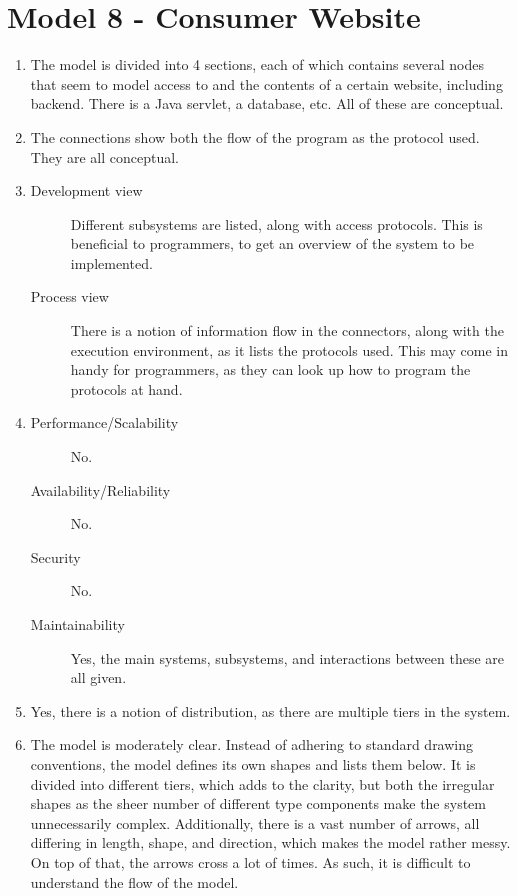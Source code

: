 \section{Model 8 - Consumer Website}
\begin{enumerate}
	\item The model is divided into 4 sections, each of which contains several nodes that seem to model access to and the contents of a certain website, including backend. There is a Java servlet, a database, etc.
	All of these are conceptual.
	
	\item The connections show both the flow of the program as the protocol used. They are all conceptual.
	
	\item
	\begin{description}
		\item[Development view] Different subsystems are listed, along with access protocols. This is beneficial to programmers, to get an overview of the system to be implemented.
		\item[Process view] There is a notion of information flow in the connectors, along with the execution environment, as it lists the protocols used.
		This may come in handy for programmers, as they can look up how to program the protocols at hand.
	\end{description}
	
	\item
	\begin{description}
		\item[Performance/Scalability] No.
		\item[Availability/Reliability] No.
		\item[Security] No.
		\item[Maintainability] Yes, the main systems, subsystems, and interactions between these are all given.
	\end{description}
	
	\item Yes, there is a notion of distribution, as there are multiple tiers in the system.
	
	\item The model is moderately clear. 
	Instead of adhering to standard drawing conventions, the model defines its own shapes and lists them below.
	It is divided into different tiers, which adds to the clarity, but both the irregular shapes as the sheer number of different type components make the system unnecessarily complex.
	Additionally, there is a vast number of arrows, all differing in length, shape, and direction, which makes the model rather messy.
	On top of that, the arrows cross a lot of times.
	As such, it is difficult to understand the flow of the model.
\end{enumerate}